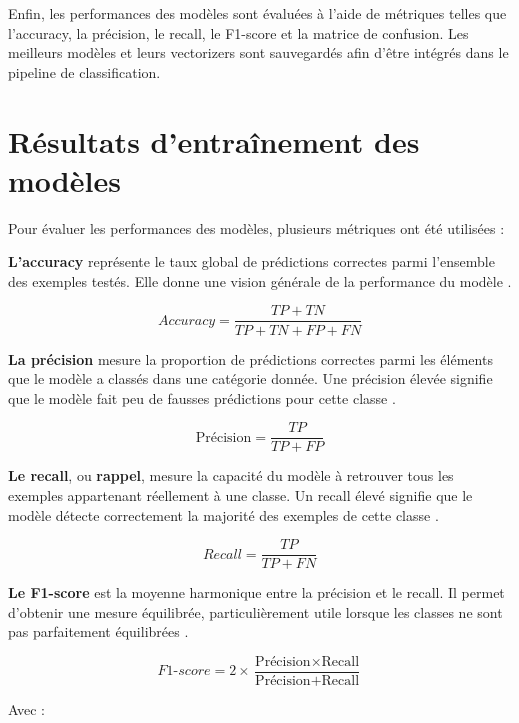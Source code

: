 \documentclass[12pt,a4paper,oneside]{report}
\begin{document}
Enfin, les performances des modèles sont évaluées à l’aide de métriques telles que l’accuracy, la précision, le recall, le F1-score et la matrice de confusion. Les meilleurs modèles et leurs vectorizers sont sauvegardés afin d’être intégrés dans le pipeline de classification.

\section{Résultats d’entraînement des modèles}

Pour évaluer les performances des modèles, plusieurs métriques ont été utilisées :

\textbf{L’accuracy} représente le taux global de prédictions correctes parmi l’ensemble des exemples testés. Elle donne une vision générale de la performance du modèle \cite{metrics}.

\begin{equation}
Accuracy = \frac{TP + TN}{TP + TN + FP + FN}
\end{equation}

\textbf{La précision} mesure la proportion de prédictions correctes parmi les éléments que le modèle a classés dans une catégorie donnée. Une précision élevée signifie que le modèle fait peu de fausses prédictions pour cette classe \cite{metrics}.

\begin{equation}
\text{Précision} = \frac{TP}{TP + FP}
\end{equation}


\textbf{Le recall}, ou \textbf{rappel}, mesure la capacité du modèle à retrouver tous les exemples appartenant réellement à une classe. Un recall élevé signifie que le modèle détecte correctement la majorité des exemples de cette classe \cite{metrics}.

\begin{equation}
Recall = \frac{TP}{TP + FN}
\end{equation}

\textbf{Le F1-score} est la moyenne harmonique entre la précision et le recall. Il permet d’obtenir une mesure équilibrée, particulièrement utile lorsque les classes ne sont pas parfaitement équilibrées \cite{metrics}.

\begin{equation}
F1\text{-}score =
2 \times \frac{\text{Précision} \times \text{Recall}}
{\text{Précision} + \text{Recall}}
\end{equation}

Avec :
\end{document}
